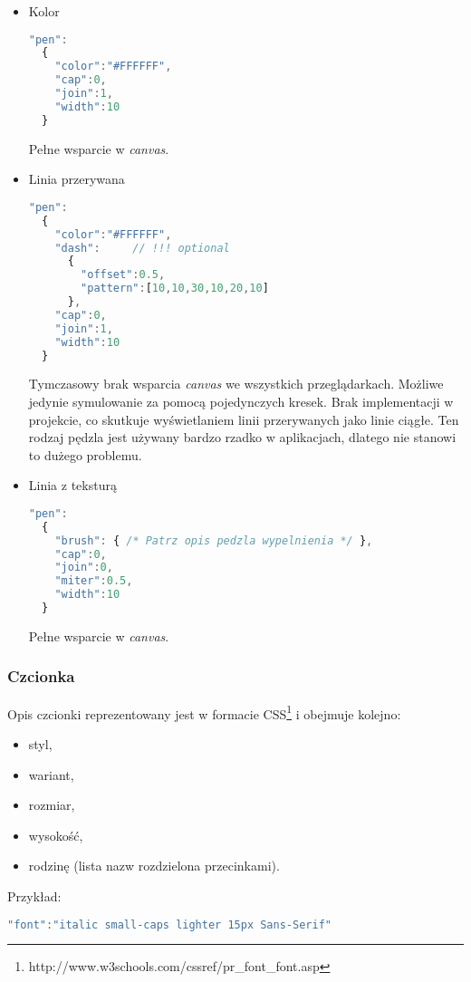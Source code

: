 \begin{itemize}
\item Kolor
\begin{lstlisting}[language=JavaScript,numbers=none]
"pen":
  {
    "color":"#FFFFFF",
    "cap":0,
    "join":1,
    "width":10
  }
\end{lstlisting}
Pełne wsparcie w \emph{canvas}.

\item Linia przerywana
\begin{lstlisting}[language=JavaScript,numbers=none]
"pen":
  {
    "color":"#FFFFFF",
    "dash":		// !!! optional
      {
        "offset":0.5,
        "pattern":[10,10,30,10,20,10]
      },
    "cap":0,
    "join":1,
    "width":10
  }
\end{lstlisting}
Tymczasowy brak wsparcia \emph{canvas} we wszystkich przeglądarkach. Możliwe jedynie symulowanie za pomocą pojedynczych kresek. Brak implementacji w projekcie, co skutkuje wyświetlaniem linii przerywanych jako linie ciągłe. Ten rodzaj pędzla jest używany bardzo rzadko w aplikacjach, dlatego nie stanowi to dużego problemu.


\item Linia z teksturą
\begin{lstlisting}[language=JavaScript,numbers=none]
"pen":
  {
    "brush": { /* Patrz opis pedzla wypelnienia */ },
    "cap":0,
    "join":0,
    "miter":0.5,
    "width":10
  }
\end{lstlisting}
Pełne wsparcie w \emph{canvas}.

\end{itemize}

\subsubsection{Czcionka}
Opis czcionki reprezentowany jest w formacie CSS\footnote{http://www.w3schools.com/cssref/pr\_font\_font.asp} i obejmuje kolejno:
\begin{itemize}
\item styl,
\item wariant,
\item rozmiar,
\item wysokość,
\item rodzinę (lista nazw rozdzielona przecinkami).
\end{itemize}

Przykład:
\begin{lstlisting}[language=JavaScript,numbers=none]
"font":"italic small-caps lighter 15px Sans-Serif"
\end{lstlisting}

